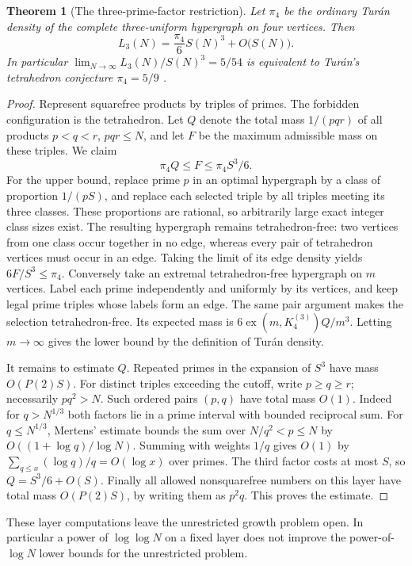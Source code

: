 \documentclass[11pt,a4paper]{article}
\newtheorem{theorem}{Theorem}[section]
\begin{document}
\begin{theorem}[The three-prime-factor restriction]\label{thm:lcm-tetra}
Let $\pi_4$ be the ordinary Tur\'an density of the complete
three-uniform hypergraph on four vertices. Then
\[
 L_3(N)=\frac{\pi_4}{6} S(N)^3+O\bigl(S(N)\bigr).
\]
In particular $\lim_{N\to\infty}L_3(N)/S(N)^3=5/54$ is equivalent to
Tur\'an's tetrahedron conjecture $\pi_4=5/9$ \cite{turan-lcm}.
\end{theorem}
\begin{proof}
Represent squarefree products by triples of primes. The forbidden
configuration is the tetrahedron. Let $Q$ denote the total mass $1/(pqr)$
of all products $p<q<r$, $pqr\le N$, and let $F$ be the maximum admissible
mass on these triples. We claim
\[
 \pi_4 Q\le F\le \pi_4 S^3/6.
\]
For the upper bound, replace prime $p$ in an optimal hypergraph by a class
of proportion $1/(pS)$, and replace each selected triple by all triples
meeting its three classes. These proportions are rational, so arbitrarily
large exact integer class sizes exist. The resulting hypergraph remains
tetrahedron-free: two vertices from one class occur together in no edge,
whereas every pair of tetrahedron vertices must occur in an edge.
Taking the limit of its edge density yields $6F/S^3\le\pi_4$.
Conversely take an extremal tetrahedron-free hypergraph on $m$ vertices.
Label each prime independently and uniformly by its vertices, and keep
legal prime triples whose labels form an edge. The same pair argument
makes the selection tetrahedron-free. Its expected mass is
$6\operatorname{ex}(m,K_4^{(3)})Q/m^3$. Letting $m\to\infty$ gives the
lower bound by the definition of Tur\'an density.

It remains to estimate $Q$. Repeated primes in the expansion of $S^3$
have mass $O(P(2)S)$. For distinct triples exceeding the cutoff, write
$p\ge q\ge r$; necessarily $pq^2>N$. Such ordered pairs $(p,q)$ have
total mass $O(1)$. Indeed for $q>N^{1/3}$ both factors lie in a prime
interval with bounded reciprocal sum. For $q\le N^{1/3}$, Mertens'
estimate bounds the sum over $N/q^2<p\le N$ by
$O((1+\log q)/\log N)$. Summing with weights $1/q$ gives $O(1)$
by $\sum_{q\le x}(\log q)/q=O(\log x)$ over primes. The third factor
costs at most $S$, so $Q=S^3/6+O(S)$. Finally all allowed nonsquarefree
numbers on this layer have total mass $O(P(2)S)$, by writing them
as $p^2q$. This proves the estimate.
\end{proof}

These layer computations leave the unrestricted growth problem open.
In particular a power of $\log\log N$ on a fixed layer does not improve
the power-of-$\log N$ lower bounds for the unrestricted problem.
\end{document}
